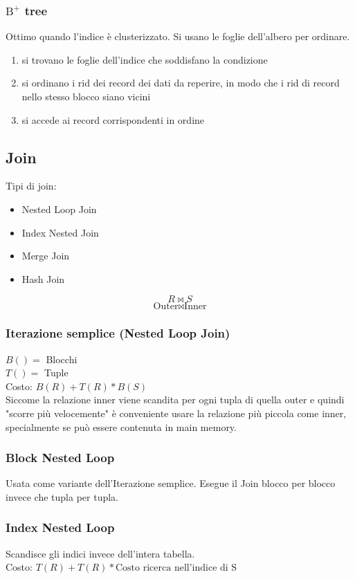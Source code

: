 \subsubsection{\texorpdfstring{$\text{B}^+$}{TEXT} tree}
Ottimo quando l'indice \`e clusterizzato. Si usano le foglie dell'albero per ordinare.
\begin{enumerate}
    \item si trovano le foglie dell’indice che soddisfano la condizione
    \item si ordinano i rid dei record dei dati da reperire, in modo che i rid di record nello stesso blocco siano vicini
    \item si accede ai record corrispondenti in ordine
\end{enumerate}

\subsection{Join}
Tipi di join:
\begin{itemize}
    \item Nested Loop Join
    \item Index Nested Join
    \item Merge Join
    \item Hash Join
\end{itemize}
$$R \bowtie S$$
$$\text{Outer} \bowtie \text{Inner}$$

\subsubsection{Iterazione semplice (Nested Loop Join)}
$B() =$ Blocchi\\
$T() =$ Tuple\\
Costo: $B(R) + T(R) * B(S)$\\
Siccome la relazione inner viene scandita per ogni tupla di quella outer e quindi "scorre più velocemente" \`e conveniente usare la relazione più piccola come inner, specialmente se può essere contenuta in main memory.

\subsubsection{Block Nested Loop}
Usata come variante dell'Iterazione semplice. Esegue il Join blocco per blocco invece che tupla per tupla.

\subsubsection{Index Nested Loop}
Scandisce gli indici invece dell'intera tabella.\\
Costo: $T(R) + T(R) * \text{Costo ricerca nell'indice di S}$

